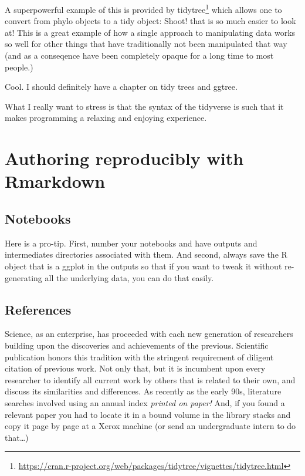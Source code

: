 \documentclass[]{krantz}
\renewcommand{\href}[2]{#2\footnote{\url{#1}}}
\begin{document}
A superpowerful example of this is provided by \href{https://cran.r-project.org/web/packages/tidytree/vignettes/tidytree.html}{tidytree}
which allows one to convert from phylo objects to a tidy object: Shoot! that
is so much easier to look at! This is a great example of how a single approach
to manipulating data works so well for other things that have traditionally not been
manipulated that way (and as a conseqence have been completely opaque for
a long time to most people.)

Cool. I should definitely have a chapter on tidy trees and ggtree.

What I really want to stress is that the syntax of the tidyverse is such
that it makes programming a relaxing and enjoying experience.

\hypertarget{authoring-reproducibly-with-rmarkdown}{%
\chapter{Authoring reproducibly with Rmarkdown}\label{authoring-reproducibly-with-rmarkdown}}

\hypertarget{notebooks}{%
\section{Notebooks}\label{notebooks}}

Here is a pro-tip. First, number your notebooks and have outputs and intermediates directories
associated with them. And second, always save the R object that is a ggplot in the outputs so that if
you want to tweak it without re-generating all the underlying data, you can do that easily.

\hypertarget{references}{%
\section{References}\label{references}}

Science, as an enterprise, has proceeded with each new generation of researchers building
upon the discoveries and achievements of the previous. Scientific publication honors this
tradition with the stringent requirement of diligent citation of previous work. Not only
that, but it is incumbent upon every researcher to identify all current work by others that
is related to their own, and discuss its similarities and differences. As recently as the early
90s, literature searches involved using an annual index \emph{printed on paper!} And, if you found
a relevant paper you had to locate it in a bound volume in the library stacks and copy it page by page
at a Xerox machine (or send an undergraduate intern to do that\ldots{})
\end{document}
